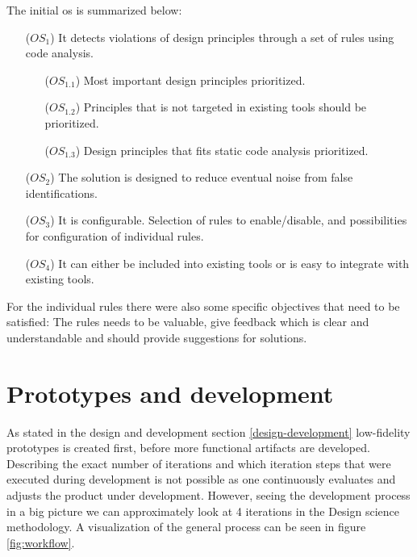 \documentclass[pdftex,10pt,b5paper,twoside]{report}
\begin{document}
The initial \gls{os} is summarized below:
\begin{itemize}
    \item [(\(OS_{1}\))] It detects violations of design principles through a set of rules using code analysis.
    \begin{itemize}
        
        \item [(\(OS_{1.1}\))] Most important design principles prioritized.
        
        \item [(\(OS_{1.2}\))] Principles that is not targeted in existing tools should be prioritized.
        
        \item [(\(OS_{1.3}\))] Design principles that fits static code analysis prioritized.
    \end{itemize}
    \item [(\(OS_{2}\))] The solution is designed to reduce eventual noise from false identifications. 
    
    \item [(\(OS_{3}\))] It is configurable. Selection of rules to enable/disable, and possibilities for configuration of individual rules.  
    
    \item [(\(OS_{4}\))] It can either be included into existing tools or is easy to integrate with existing tools.
\end{itemize}

For the individual rules there were also some specific objectives that need to be satisfied: The rules needs to be valuable, give feedback which is clear and understandable and should provide suggestions for solutions.

\section{Prototypes and development}
\label{on-prototypes}
As stated in the design and development section \ref{design-development} low-fidelity prototypes is created first, before more functional artifacts are developed. Describing the exact number of iterations and which iteration steps that were executed during development is not possible as one continuously evaluates and adjusts the product under development. However, seeing the development process in a big picture we can approximately look at 4 iterations in the Design science methodology. A visualization of the general process can be seen in figure \ref{fig:workflow}.
\end{document}

